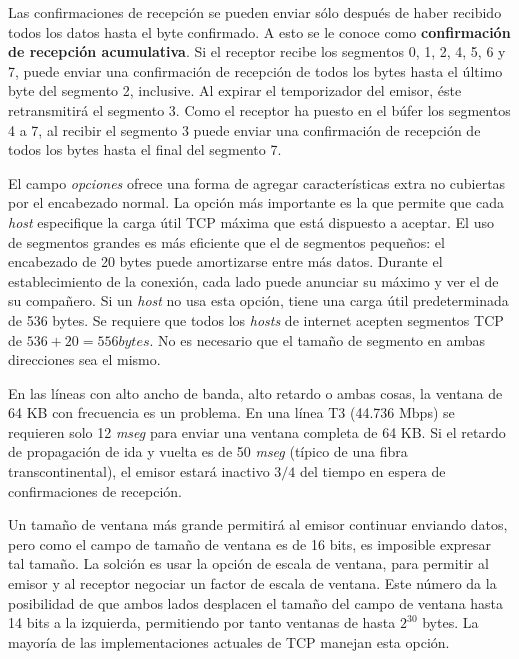 \documentclass[10pt,a4paper]{report}
\begin{document}
	\par Las confirmaciones de recepción se pueden enviar sólo después de haber recibido todos los datos hasta el byte confirmado. A esto se le conoce como \textbf{confirmación de recepción acumulativa}. Si el receptor recibe los segmentos 0, 1, 2, 4, 5, 6 y 7, puede enviar una confirmación de recepción de todos los bytes hasta el último byte del segmento 2, inclusive. Al expirar el temporizador del emisor, éste retransmitirá el segmento 3. Como el receptor ha puesto en el búfer los segmentos 4 a 7, al recibir el segmento 3 puede enviar una confirmación de recepción de todos los bytes hasta el final del segmento 7.	

	\par El campo \textit{opciones} ofrece una forma de agregar características extra no cubiertas por el encabezado normal. La opción más importante es la que permite que cada \textit{host} especifique la carga útil TCP máxima que está dispuesto a aceptar. El uso de segmentos grandes es más eficiente que el de segmentos pequeños: el encabezado de 20 bytes puede amortizarse entre más datos. Durante el establecimiento de la conexión, cada lado puede anunciar su máximo y ver el de su compañero. Si un \textit{host} no usa esta opción, tiene una carga útil predeterminada de 536 bytes. Se requiere que todos los \textit{hosts} de internet acepten segmentos TCP de $ 536 + 20 = 556  bytes $. No es necesario que el tamaño de segmento en ambas direcciones sea el mismo.

	\par En las líneas con alto ancho de banda, alto retardo o ambas cosas, la ventana de 64 KB con frecuencia es un problema. En una línea T3 (44.736 Mbps) se requieren solo 12 \textit{mseg} para enviar una ventana completa de 64 KB. Si el retardo de propagación de ida y vuelta es de 50 \textit{mseg} (típico de una fibra transcontinental), el emisor estará inactivo $3/4$ del tiempo en espera de confirmaciones de recepción.

	\par Un tamaño de ventana más grande permitirá al emisor continuar enviando datos, pero como el campo de tamaño de ventana es de 16 bits, es imposible expresar tal tamaño. La solción es usar la opción de escala de ventana, para permitir al emisor y al receptor negociar un factor de escala de ventana. Este número da la posibilidad de que ambos lados desplacen el tamaño del campo de ventana hasta 14 bits a la izquierda, permitiendo por tanto ventanas de hasta $2^{30}$ bytes. La mayoría de las implementaciones actuales de TCP manejan esta opción.
\end{document}
